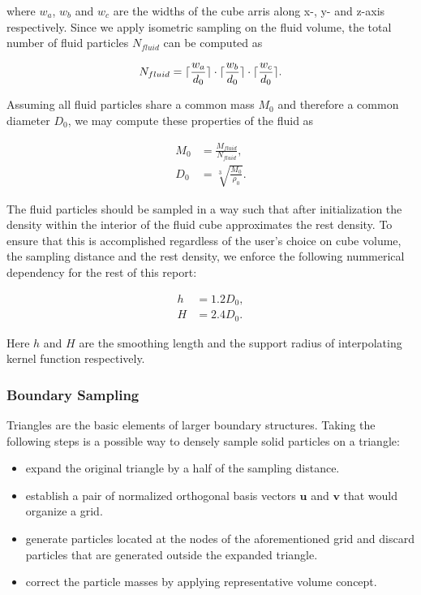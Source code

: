 \documentclass[
	11pt, 
	DIV10,
	ngerman,
	a4paper, 
	oneside, 
	headings=normal, 
	captions=tableheading,
	final, 
	numbers=noenddot
]{scrartcl}
\DeclarePairedDelimiter{\ceil}{\lceil}{\rceil}
\begin{document}
where $ w_{a} $, $ w_{b} $ and $ w_{c} $ are the widths of the cube arris along x-, y- and z-axis respectively. Since we apply isometric sampling on the fluid volume, the total number of fluid particles $ N_{fluid} $ can be computed as

\begin{equation}
	\label{eq2}
	N_{fluid} = \ceil{\frac{w_{a}}{d_{0}}} \cdot \ceil{\frac{w_{b}}{d_{0}}} \cdot \ceil{\frac{w_{c}}{d_{0}}}.
\end{equation}

Assuming all fluid particles share a common mass $ M_{0} $ and therefore a common diameter $ D_{0} $, we may compute these properties of the fluid as

\begin{equation}
\begin{split}
	\label{eq3}
	M_{0} &= \frac{M_{fluid}}{N_{fluid}}, \\[1em]
	D_{0} &= \sqrt[3]{\frac{M_{0}}{\rho_{0}}}.
\end{split}
\end{equation}

The fluid particles should be sampled in a way such that after initialization the density within the interior of the fluid cube approximates the rest density. To ensure that this is accomplished regardless of the user's choice on cube volume, the sampling distance and the rest density, we enforce the following nummerical dependency for the rest of this report:

\begin{equation}
\begin{split}
	\label{eq4}
	h &= 1.2D_{0}, \\[1em]
	H &= 2.4D_{0}.
\end{split}
\end{equation}

Here $ h $ and $ H $ are the smoothing length and the support radius of interpolating kernel function respectively.

\subsubsection{Boundary Sampling}

Triangles are the basic elements of larger boundary structures. Taking the following steps is a possible way to densely sample solid particles on a triangle:

\begin{itemize}
    \item expand the original triangle by a half of the sampling distance.
    \item establish a pair of normalized orthogonal basis vectors $ \boldsymbol{u} $ and $ \boldsymbol{v} $ that would organize a grid.
    \item generate particles located at the nodes of the aforementioned grid and discard particles that are generated outside the expanded triangle.
    \item correct the particle masses by applying representative volume concept.
\end{itemize}
\end{document}
